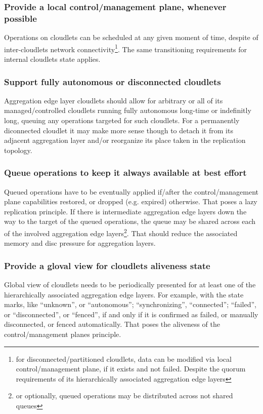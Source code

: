 \documentclass[conference]{IEEEtran}
\begin{document}
\subsubsection{Provide a local control/management plane, whenever possible}

Operations on cloudlets can be scheduled at any given moment of time, despite
of inter-cloudlets network connectivity\footnote{for disconnected/partitioned
cloudlets, data can be modified via local control/management plane, if it
exists and not failed. Despite the quorum requirements of its hierarchically
associated aggregation edge layers}. The same transitioning requirements for
internal cloudlets state applies.

\subsubsection{Support fully autonomous or disconnected cloudlets}

Aggregation edge layer cloudlets should allow for arbitrary or all of
its managed/controlled cloudlets running fully autonomous long-time or
indefinitly long, queuing any operations targeted for such cloudlets.
For a permanently diconnected cloudlet it may make more sense though to
detach it from its adjacent aggregation layer and/or reorganize its place
taken in the replication topology.

\subsubsection{Queue operations to keep it always available at best
effort}

Queued operations have to be eventually applied if/after the control/management
plane capabilities restored, or dropped (e.g. expired) otherwise. That poses a
lazy replication principle. If there is intermediate aggregation edge layers
down the way to the target of the queued operations, the queue may be shared
across each of the involved aggregation edge layers\footnote{or optionally,
queued operations may be distributed across not shared queues}. That should
reduce the associated memory and disc pressure for aggregation layers.

\subsubsection{Provide a gloval view for cloudlets aliveness state}

Global view of cloudlets needs to be periodically presented for at least one of
the hierarchically associated aggregation edge layers. For example, with the
state marks, like ``unknown'', or ``autonomous''; ``synchronizing'',
``connected''; ``failed'', or ``disconnected'', or ``fenced'', if and only if
it is confirmed as failed, or manually disconnected, or fenced automatically.
That poses the aliveness of the control/management planes principle.
\end{document}

